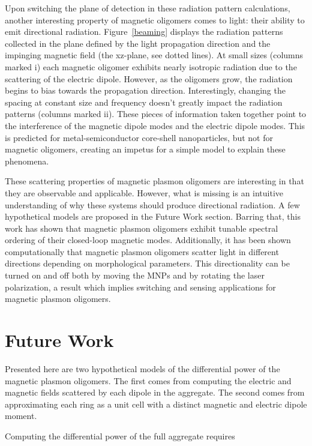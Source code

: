 \documentclass[12pt, letterpaper, twoside]{report}
\begin{document}
Upon switching the plane of detection in these radiation pattern calculations, another interesting property of magnetic oligomers comes to light: their ability to emit directional radiation. Figure~\ref{beaming} displays the radiation patterns collected in the plane defined by the light propagation direction and the impinging magnetic field (the xz-plane, see dotted lines). At small sizes (columns marked i) each magnetic oligomer exhibits nearly isotropic radiation due to the scattering of the electric dipole. However, as the oligomers grow, the radiation begins to bias towards the propagation direction. Interestingly, changing the spacing at constant size and frequency doesn't greatly impact the radiation patterns (columns marked ii). These pieces of information taken together point to the interference of the magnetic dipole modes and the electric dipole modes. This is predicted for metal-semiconductor core-shell nanoparticles, but not for magnetic oligomers\cite{Kivshar2012}, creating an impetus for a simple model to explain these phenomena.

These scattering properties of magnetic plasmon oligomers are interesting in that they are observable and applicable. However, what is missing is an intuitive understanding of why these systems should produce directional radiation. A few hypothetical models are proposed in the Future Work section. Barring that, this work has shown that magnetic plasmon oligomers exhibit tunable spectral ordering of their closed-loop magnetic modes. Additionally, it has been shown computationally that magnetic plasmon oligomers scatter light in different directions depending on morphological parameters. This directionality can be turned on and off both by moving the MNPs and by rotating the laser polarization, a result which implies switching and sensing applications for magnetic plasmon oligomers.

\section*{Future Work}
Presented here are two hypothetical models of the differential power of the magnetic plasmon oligomers. The first comes from computing the electric and magnetic fields scattered by each dipole in the aggregate. The second comes from approximating each ring as a unit cell with a distinct magnetic and electric dipole moment\cite{Kivshar2012}.

Computing the differential power of the full aggregate requires\cite{jackson_classical_1999}
\end{document}

